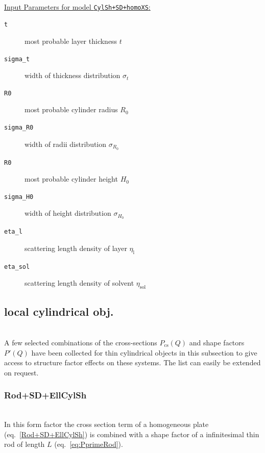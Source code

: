 \hspace{1pt}\\
\underline{Input Parameters for model \texttt{CylSh+SD+homoXS}:}\\
\begin{description}
\item[\texttt{t}] most probable layer thickness $t$
\item[\texttt{sigma\_t}] width of thickness distribution $\sigma_t$
\item[\texttt{R0}] most probable cylinder radius $R_0$
\item[\texttt{sigma\_R0}] width of radii distribution $\sigma_{R_0}$
\item[\texttt{R0}] most probable cylinder height $H_0$
\item[\texttt{sigma\_H0}] width of height distribution $\sigma_{H_0}$
\item[\texttt{eta\_l}] scattering length density of layer $\eta_\mathrm{l}$
\item[\texttt{eta\_sol}] scattering length density of solvent $\eta_\mathrm{sol}$
\end{description}

\clearpage
\subsection{local cylindrical obj.} ~\\
\label{plugin:LocalCylindrical)}
A few selected combinations of the cross-sections $P_\mathrm{cs}(Q)$ and shape factors $P'(Q)$ have
been collected for thin cylindrical objects in this subsection to give access to structure factor
effects on these systems. The list can easily be extended on request.

\vspace{5mm}

\noindent
\subsubsection{Rod+SD+EllCylSh} ~\\

\noindent
In this form factor the cross section term of a homogeneous plate (eq.\ \ref{Rod+SD+EllCylSh}) is combined with a shape factor of a infinitesimal thin rod of length $L$ (eq.\ \ref{eq:PprimeRod}).

\vspace{5mm}

